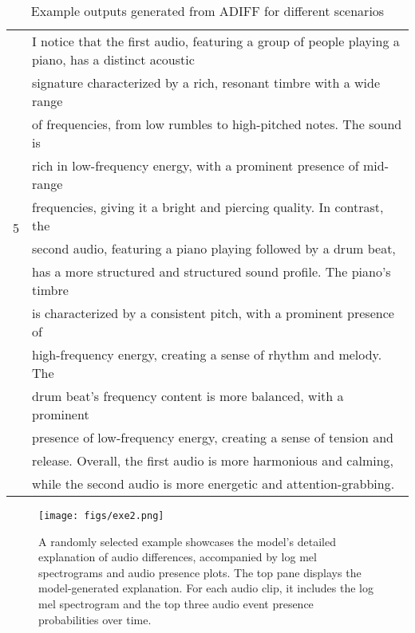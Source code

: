 \begin{table}
{\begin{tabular}{ll}
\multirow{10}{*}{5} & I notice that the first audio, featuring a group of people playing a piano, has a distinct acoustic \\ & signature characterized by a rich, resonant timbre with a wide range \\ & of frequencies, from low rumbles to high-pitched notes. The sound is \\ & rich in low-frequency energy, with a prominent presence of mid-range \\ & frequencies, giving it a bright and piercing quality. In contrast, the \\ & second audio, featuring a piano playing followed by a drum beat, \\ & has a more structured and structured sound profile. The piano’s timbre \\ & is characterized by a consistent pitch, with a prominent presence of \\ & high-frequency energy, creating a sense of rhythm and melody. The \\ & drum beat’s frequency content is more balanced, with a prominent \\ & presence of low-frequency energy, creating a sense of tension and \\ & release. Overall, the first audio is more harmonious and calming, \\ & while the second audio is more energetic and attention-grabbing. \\
\bottomrule
\end{tabular}}
\caption{\small Example outputs generated from ADIFF for different scenarios}
\label{tab:sents}
\end{table}

\begin{figure*}[ht]
   \centering
     \texttt{[image: figs/exe2.png]}
     \caption{\small A randomly selected example showcases the model’s detailed explanation of audio differences, accompanied by log mel spectrograms and audio presence plots. The top pane displays the model-generated explanation. For each audio clip, it includes the log mel spectrogram and the top three audio event presence probabilities over time.
     }
     \label{fig:random FT example}
\end{figure*}

